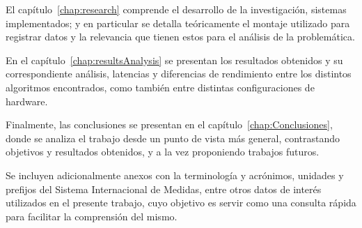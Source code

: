 El capítulo~\ref{chap:research} comprende el desarrollo de la investigación, sistemas implementados; y en particular se detalla teóricamente el montaje utilizado para registrar datos y la relevancia que tienen estos para el análisis de la problemática.

En el capítulo~\ref{chap:resultsAnalysis} se presentan los resultados obtenidos y su correspondiente análisis, latencias y diferencias de rendimiento entre los distintos algoritmos encontrados, como también entre distintas configuraciones de hardware.

Finalmente, las conclusiones se presentan en el capítulo~\ref{chap:Conclusiones}, donde se analiza el trabajo desde un punto de vista más general, contrastando objetivos y resultados obtenidos, y a la vez proponiendo trabajos futuros.

Se incluyen adicionalmente anexos con la terminología y acrónimos, unidades y prefijos del Sistema Internacional de Medidas, entre otros datos de interés utilizados en el presente trabajo, cuyo objetivo es servir como una consulta rápida para facilitar la comprensión del mismo.

